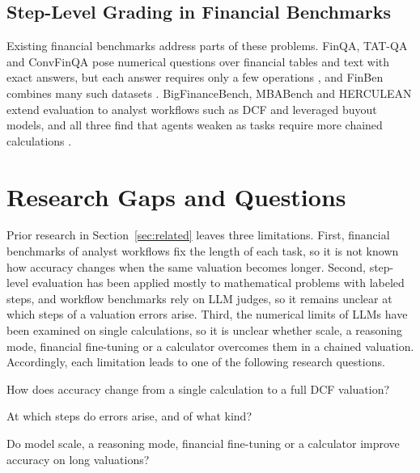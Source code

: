 \documentclass[conference]{IEEEtran}
\begin{document}
\subsection{Step-Level Grading in Financial Benchmarks}\label{sec:rwD}
Existing financial benchmarks address parts of these problems. FinQA, TAT-QA and ConvFinQA pose numerical questions over financial tables and text with exact answers, but each answer requires only a few operations \cite{b6,b7,b8}, and FinBen combines many such datasets \cite{b9}. BigFinanceBench, MBABench and HERCULEAN extend evaluation to analyst workflows such as DCF and leveraged buyout models, and all three find that agents weaken as tasks require more chained calculations \cite{b10,b11,b12}.

\section{Research Gaps and Questions}\label{sec:rq}
Prior research in Section~\ref{sec:related} leaves three limitations. First, financial benchmarks of analyst workflows fix the length of each task, so it is not known how accuracy changes when the same valuation becomes longer. Second, step-level evaluation has been applied mostly to mathematical problems with labeled steps, and workflow benchmarks rely on LLM judges, so it remains unclear at which steps of a valuation errors arise. Third, the numerical limits of LLMs have been examined on single calculations, so it is unclear whether scale, a reasoning mode, financial fine-tuning or a calculator overcomes them in a chained valuation. Accordingly, each limitation leads to one of the following research questions.
\begin{list}{}{\setlength{\leftmargin}{2.5em}\setlength{\labelwidth}{2.1em}\setlength{\labelsep}{0.4em}\setlength{\itemsep}{0pt}\setlength{\parsep}{0pt}\setlength{\topsep}{3pt}}
\item[RQ1.] How does accuracy change from a single calculation to a full DCF valuation?
\item[RQ2.] At which steps do errors arise, and of what kind?
\item[RQ3.] Do model scale, a reasoning mode, financial fine-tuning or a calculator improve accuracy on long valuations?
\end{list}
\end{document}
